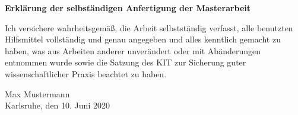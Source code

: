 \cleardoublepage
\thispagestyle{empty}
\null\vspace{5cm}
{\noindent \textbf{Erklärung der selbständigen Anfertigung der
Masterarbeit}\hfill}
\vspace{1cm}

\noindent
Ich versichere wahrheitsgemäß, die Arbeit
selbstständig verfasst, alle benutzten Hilfsmittel vollständig und genau angegeben und alles
kenntlich gemacht zu haben, was aus Arbeiten anderer unverändert oder mit Abänderungen
entnommen wurde sowie die Satzung des KIT zur Sicherung guter wissenschaftlicher Praxis beachtet zu haben.

\vspace{12ex}

\noindent
\hrulefill\hspace{9cm}

\noindent
Max Mustermann\\
\noindent
Karlsruhe, den 10. Juni 2020
